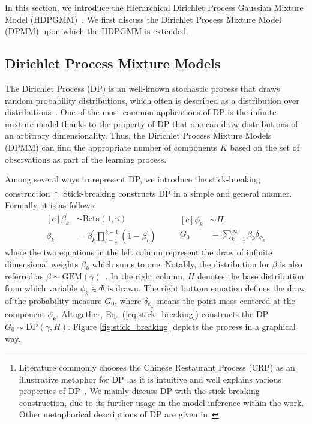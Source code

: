 \documentclass{article}
\begin{document}
In this section, we introduce the Hierarchical Dirichlet Process Gaussian Mixture Model (HDPGMM)~\cite{DBLP:conf/ismir/HoffmanBC08, doi:10.1198/016214506000000302}. We first discuss the Dirichlet Process Mixture Model (DPMM) upon which the HDPGMM is extended.

\subsection{Dirichlet Process Mixture Models}\label{sec:hdpgmm:dpmm}

The Dirichlet Process (DP) is an well-known stochastic process that draws random probability distributions, which often is described as a distribution over distributions~\cite{DBLP:reference/ml/Teh17}. One of the most common applications of DP is the infinite mixture model thanks to the property of DP that one can draw distributions of an arbitrary dimensionality. Thus, the Dirichlet Process Mixture Models (DPMM) can find the appropriate number of components $K$ based on the set of observations as part of the learning process.

Among several ways to represent DP, we introduce the stick-breaking construction~\cite{sethuraman94}\footnote{Literature commonly chooses the Chinese Restaurant Process (CRP) as an illustrative metaphor for DP ,as it is intuitive and well explains various properties of DP~\cite{DBLP:reference/ml/Teh17}. We mainly discuss DP with the stick-breaking construction, due to its further usage in the model inference within the work. Other metaphorical descriptions of DP are given in~\cite{DBLP:reference/ml/Teh17, DBLP:conf/ismir/HoffmanBC08}}.
Stick-breaking constructs DP in a simple and general manner. Formally, it is as follows:
\begin{equation}\label{eq:stick_breaking}
\begin{aligned}[c]
    \beta^{\prime}_{k} &\sim \text{Beta}(1, \gamma) \\
    \beta_{k} &= \beta^{\prime}_{k} \prod_{l=1}^{k-1} (1 - \beta_{l}^{\prime})
\end{aligned}
\qquad
\begin{aligned}[c]
    \phi_{k} &\sim H \\
    G_{0} &= \sum^{\infty}_{k=1} \beta_{k}\delta_{\phi_{k}}
\end{aligned}
\end{equation}
where the two equations in the left column represent the draw of infinite dimensional weights $\beta_{k}$ which sums to one. Notably, the distribution for $\beta$ is also referred as $\beta \sim \text{GEM}(\gamma)$~\cite{DBLP:journals/cpc/Pitman02}. In the right column, $H$ denotes the base distribution from which variable $\phi_{k}\in\Phi$ is drawn. The right bottom equation defines the draw of the probability measure $G_{0}$, where $\delta_{\phi_{k}}$ means the point mass centered at the component $\phi_{k}$. Altogether, Eq.\ (\ref{eq:stick_breaking}) constructs the DP $G_{0} \sim \text{DP}(\gamma, H)$. Figure \ref{fig:stick_breaking} depicts the process in a graphical way.
\end{document}
